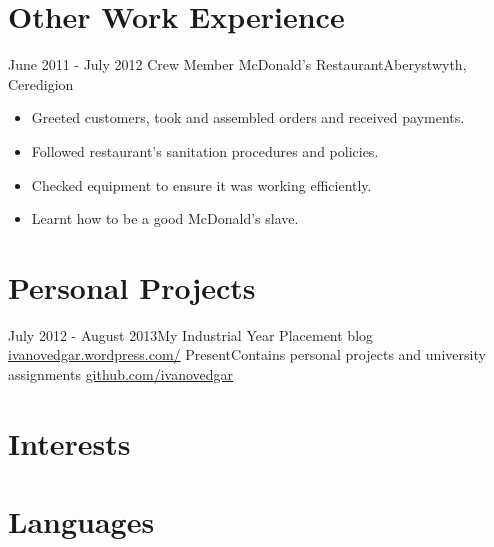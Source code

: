 \documentclass[11pt,a4paper]{moderncv}
\begin{document}
\section{Other Work Experience}
    
\cventry
	{June 2011 - July 2012 }{Crew Member}
	{McDonald's Restaurant}{Aberystwyth, Ceredigion}
	{}{
    	\begin{itemize}
           \item Greeted customers, took and assembled orders and received payments.
           \item Followed restaurant's sanitation procedures and policies.
           \item Checked equipment to ensure it was working efficiently.
           \item Learnt how to be a good McDonald's slave.
    	\end{itemize}
	}
	
\section{Personal Projects}
\cventry
	{July 2012 - August 2013}{My Industrial Year Placement blog}
	{\href{http://ivanovedgar.wordpress.com/}{ivanovedgar.wordpress.com/}}{}
	{}{}
\cventry
	{Present}{Contains personal projects and university assignments}
	{\href{http://github.com/ivanovedgar}{github.com/ivanovedgar}}{}
	{}{}

\section{Interests}

\section{Languages}
\end{document}
